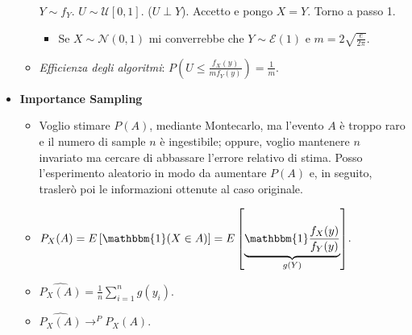 \documentclass[8pt]{extarticle}
\begin{document}
\begin{multicols*}{3}
\begin{itemize}
\begin{itemize}
\begin{algorithmic}[1]
                            \State $Y\sim f_{Y}$.
                            \State $U\sim\mathcal{U}[0,1]$. ($U\perp Y$).
                            \State Accetto e pongo $X=Y$.
                            \Else
                            \State Torno a passo 1.
                            \EndIf
                        \end{algorithmic}
                        \begin{itemize}
                            \item Se $X\sim\mathcal{N}(0,1)$ mi converrebbe che $Y\sim\mathcal{E}(1)$ e $m=2\sqrt{\frac{e}{2\pi}}$.
                        \end{itemize}
                  \item \textit{Efficienza degli algoritmi}: $P\left(U\leq \frac{f_{X}(y)}{mf_{Y}(y)}\right)=\frac{1}{m}$.
              \end{itemize}
        \item \textbf{Importance Sampling}
              \begin{itemize}
                  \item Voglio stimare $P(A)$, mediante Montecarlo, ma l'evento $A$ è troppo raro e il numero di sample $n$ è ingestibile; oppure, voglio mantenere $n$ invariato ma cercare di abbassare l'errore relativo di stima. Posso l'esperimento aleatorio in modo da aumentare $P(A)$ e, in seguito, traslerò poi le informazioni ottenute al caso originale.
                  \item $P_{X}(A)=E\left[\mathbbm{1}(X\in A)\right]=E\left[\underbrace{\mathbbm{1}\frac{f_{X}(y)}{f_{Y}(y)}}_{g(Y)}\right]$.
                  \item $\hat{P_{X}(A)}=\frac{1}{n}\sum_{i=1}^{n}g(y_{i})$.
                  \item $\hat{P_{X}(A)}\rightarrow^{P} P_{X}(A)$.
              \end{itemize}
    \end{itemize}

\end{multicols*}
\end{document}

